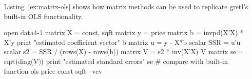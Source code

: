 Listing~\ref{ex:matrix-ols} shows how matrix methods can be used to
replicate gretl's built-in OLS functionality.

\begin{script}[htbp]
\begin{scode}
open data4-1
matrix X = { const, sqft }
matrix y = { price }
matrix b = invpd(X'X) * X'y
print "estimated coefficient vector"
b
matrix u = y - X*b
scalar SSR = u'u
scalar s2 = SSR / (rows(X) - rows(b))
matrix V = s2 * inv(X'X)
V
matrix se = sqrt(diag(V))
print "estimated standard errors"
se
# compare with built-in function
ols price const sqft --vcv
\end{scode}
\end{script}

